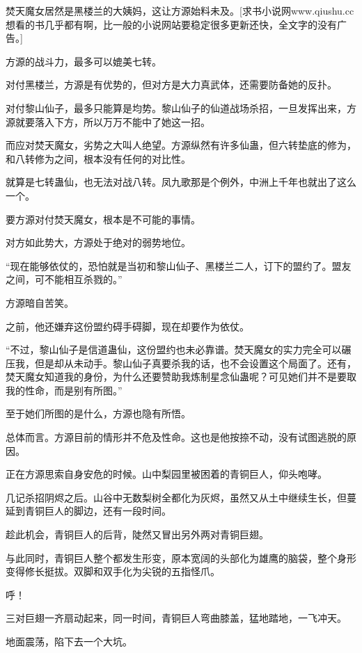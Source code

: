 
\begin{this_body}

焚天魔女居然是黑楼兰的大姨妈，这让方源始料未及。[求书小说网www.qiushu.cc想看的书几乎都有啊，比一般的小说网站要稳定很多更新还快，全文字的没有广告。]

方源的战斗力，最多可以媲美七转。

对付黑楼兰，方源是有优势的，但对方是大力真武体，还需要防备她的反扑。

对付黎山仙子，最多只能算是均势。黎山仙子的仙道战场杀招，一旦发挥出来，方源就要落入下方，所以万万不能中了她这一招。

而应对焚天魔女，劣势之大叫人绝望。方源纵然有许多仙蛊，但六转垫底的修为，和八转修为之间，根本没有任何的对比性。

就算是七转蛊仙，也无法对战八转。凤九歌那是个例外，中洲上千年也就出了这么一个。

要方源对付焚天魔女，根本是不可能的事情。

对方如此势大，方源处于绝对的弱势地位。

“现在能够依仗的，恐怕就是当初和黎山仙子、黑楼兰二人，订下的盟约了。盟友之间，可不能相互杀戮的。”

方源暗自苦笑。

之前，他还嫌弃这份盟约碍手碍脚，现在却要作为依仗。

“不过，黎山仙子是信道蛊仙，这份盟约也未必靠谱。焚天魔女的实力完全可以碾压我，但是却从未动手。黎山仙子真要杀我的话，也不会设置这个局面了。还有，焚天魔女知道我的身份，为什么还要赞助我炼制星念仙蛊呢？可见她们并不是要取我的性命，而是别有所图。”

至于她们所图的是什么，方源也隐有所悟。

总体而言。方源目前的情形并不危及性命。这也是他按捺不动，没有试图逃脱的原因。

正在方源思索自身安危的时候。山中梨园里被困着的青铜巨人，仰头咆哮。

几记杀招阴烬之后。山谷中无数梨树全都化为灰烬，虽然又从土中继续生长，但蔓延到青铜巨人的脚边，还有一段时间。

趁此机会，青铜巨人的后背，陡然又冒出另外两对青铜巨翅。

与此同时，青铜巨人整个都发生形变，原本宽阔的头部化为雄鹰的脑袋，整个身形变得修长挺拔。双脚和双手化为尖锐的五指怪爪。

呼！

三对巨翅一齐扇动起来，同一时间，青铜巨人弯曲膝盖，猛地踏地，一飞冲天。

地面震荡，陷下去一个大坑。


\end{this_body}
